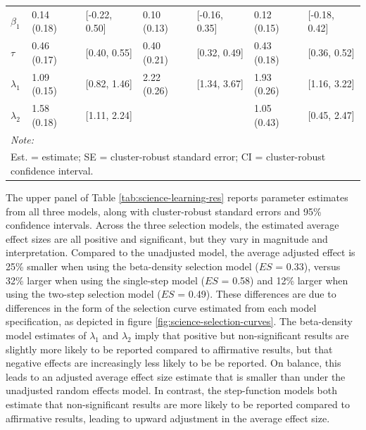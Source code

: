\documentclass[
  american,
  man, donotrepeattitle,floatsintext]{apa7}
\begin{document}
\begin{table}
\begin{tabular}[t]{lllllll}
\hspace{1em}$\beta_1$ & 0.14 (0.18) & {}[-0.22, 0.50] & 0.10 (0.13) & {}[-0.16, 0.35] & 0.12 (0.15) & {}[-0.18, 0.42]\\
\hspace{1em}$\tau$ & 0.46 (0.17) & {}[0.40, 0.55] & 0.40 (0.21) & {}[0.32, 0.49] & 0.43 (0.18) & {}[0.36, 0.52]\\
\hspace{1em}$\lambda_1$ & 1.09 (0.15) & {}[0.82, 1.46] & 2.22 (0.26) & {}[1.34, 3.67] & 1.93 (0.26) & {}[1.16, 3.22]\\
\hspace{1em}$\lambda_2$ & 1.58 (0.18) & {}[1.11, 2.24] &  &  & 1.05 (0.43) & {}[0.45, 2.47]\\
\bottomrule
\multicolumn{7}{l}{\rule{0pt}{1em}\textit{Note: }}\\
\multicolumn{7}{l}{\rule{0pt}{1em}Est. = estimate; SE = cluster-robust standard error; CI = cluster-robust confidence interval.}\\
\end{tabular}
\end{table}

The upper panel of Table \ref{tab:science-learning-res} reports parameter estimates from all three models, along with cluster-robust standard errors and 95\% confidence intervals.
Across the three selection models, the estimated average effect sizes are all positive and significant, but they vary in magnitude and interpretation. Compared to the unadjusted model, the average adjusted effect is 25\% smaller when using the beta-density selection model (\(ES\) = 0.33), versus 32\% larger when using the single-step model (\(ES\) = 0.58) and 12\% larger when using the two-step selection model (\(ES\) = 0.49).
These differences are due to differences in the form of the selection curve estimated from each model specification, as depicted in figure \ref{fig:science-selection-curves}.
The beta-density model estimates of \(\lambda_1\) and \(\lambda_2\) imply that positive but non-significant results are slightly more likely to be reported compared to affirmative results, but that negative effects are increasingly less likely to be be reported.
On balance, this leads to an adjusted average effect size estimate that is smaller than under the unadjusted random effects model.
In contrast, the step-function models both estimate that non-significant results are more likely to be reported compared to affirmative results, leading to upward adjustment in the average effect size.
\end{document}
